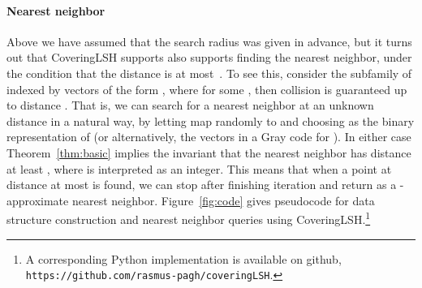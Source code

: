 \documentclass[prodmode,acmtalg]{acmsmall}
\begin{document}
\paragraph{Nearest neighbor} 

Above we have assumed that the search radius  was given in advance, but it turns out that CoveringLSH supports also supports finding the nearest neighbor, under the condition that the distance is at most~.
To see this, consider the subfamily of  indexed by vectors of the form , where  for some , then collision is guaranteed up to distance .
That is, we can search for a nearest neighbor at an unknown distance in a natural way, by letting  map randomly to  and choosing  as the binary representation of  (or alternatively, the vectors in a Gray code for ).
In either case Theorem~\ref{thm:basic} implies the invariant that the nearest neighbor has distance at least , where  is interpreted as an integer.
This means that when a point  at distance at most  is found, we can stop after finishing iteration  and return  as a -approximate nearest neighbor.
Figure~\ref{fig:code} gives pseudocode for data structure construction and nearest neighbor queries using CoveringLSH.\footnote{A corresponding Python implementation is available on github, {\tt https://github.com/rasmus-pagh/coveringLSH}.}
\end{document}
